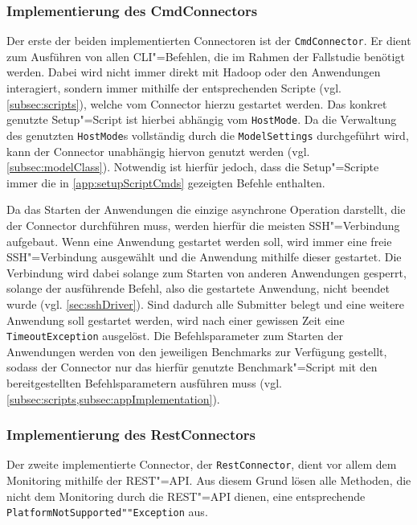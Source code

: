 \subsubsection{Implementierung des CmdConnectors}
\label{subsubsec:implCmdConnector}

Der erste der beiden implementierten Connectoren ist der \texttt{CmdConnector}.
Er dient zum Ausführen von allen CLI"=Befehlen, die im Rahmen der Fallstudie benötigt werden.
Dabei wird nicht immer direkt mit Hadoop oder den Anwendungen interagiert, sondern immer mithilfe der entsprechenden Scripte (vgl. \cref{subsec:scripts}), welche vom Connector hierzu gestartet werden.
Das konkret genutzte Setup"=Script ist hierbei abhängig vom \texttt{HostMode}.
Da die Verwaltung des genutzten \texttt{HostMode}s vollständig durch die \texttt{ModelSettings} durchgeführt wird, kann der Connector unabhängig hiervon genutzt werden (vgl. \cref{subsec:modelClass}).
Notwendig ist hierfür jedoch, dass die Setup"=Scripte immer die in \cref{app:setupScriptCmds} gezeigten Befehle enthalten.

Da das Starten der Anwendungen die einzige asynchrone Operation darstellt, die der Connector durchführen muss, werden hierfür die meisten SSH"=Verbindung aufgebaut.
Wenn eine Anwendung gestartet werden soll, wird immer eine freie SSH"=Verbindung ausgewählt und die Anwendung mithilfe dieser gestartet.
Die Verbindung wird dabei solange zum Starten von anderen Anwendungen gesperrt, solange der ausführende Befehl, also die gestartete Anwendung, nicht beendet wurde (vgl. \cref{sec:sshDriver}).
Sind dadurch alle Submitter belegt und eine weitere Anwendung soll gestartet werden, wird nach einer gewissen Zeit eine \texttt{TimeoutException} ausgelöst.
Die Befehlsparameter zum Starten der Anwendungen werden von den jeweiligen Benchmarks zur Verfügung gestellt, sodass der Connector nur das hierfür genutzte Benchmark"=Script mit den bereitgestellten Befehlsparametern ausführen muss (vgl. \cref{subsec:scripts,subsec:appImplementation}).

\subsubsection{Implementierung des RestConnectors}
\label{subsubsec:implRestConnector}

Der zweite implementierte Connector, der \texttt{RestConnector}, dient vor allem dem Monitoring mithilfe der REST"=API.
Aus diesem Grund lösen alle Methoden, die nicht dem Monitoring durch die REST"=API dienen, eine entsprechende \texttt{PlatformNotSupported""Exception} aus.

